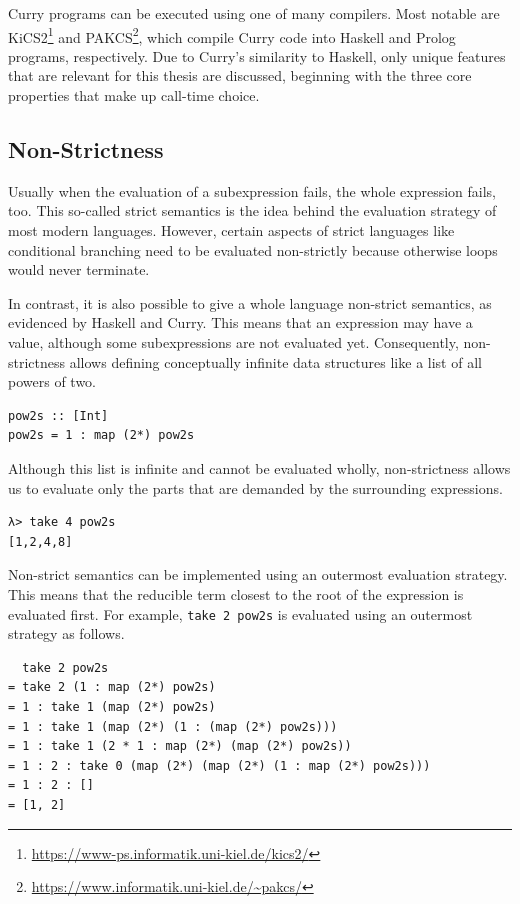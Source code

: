 \documentclass[a4paper, 11pt, fleqn, twoside]{scrreprt}
\newcommand{\hinl}[1]{\texttt{#1}}
\begin{document}
Curry programs can be executed using one of many compilers.
Most notable are KiCS2\footnote{\url{https://www-ps.informatik.uni-kiel.de/kics2/}} and PAKCS\footnote{\url{https://www.informatik.uni-kiel.de/~pakcs/}}, which compile Curry code into Haskell and Prolog programs, respectively.
Due to Curry's similarity to Haskell, only unique features that are relevant for this thesis are discussed, beginning with the three core properties that make up call-time choice.

\subsection{Non-Strictness}
Usually when the evaluation of a subexpression fails, the whole expression fails, too.
This so-called strict semantics is the idea behind the evaluation strategy of most modern languages.
However, certain aspects of strict languages like conditional branching need to be evaluated non-strictly because otherwise loops would never terminate.

In contrast, it is also possible to give a whole language non-strict semantics, as evidenced by Haskell and Curry.
This means that an expression may have a value, although some subexpressions are not evaluated yet.
Consequently, non-strictness allows defining conceptually infinite data structures like a list of all powers of two.

\begin{verbatim}
pow2s :: [Int]
pow2s = 1 : map (2*) pow2s
\end{verbatim}

Although this list is infinite and cannot be evaluated wholly, non-strictness allows us to evaluate only the parts that are demanded by the surrounding expressions.

\begin{verbatim}
λ> take 4 pow2s
[1,2,4,8]
\end{verbatim}

Non-strict semantics can be implemented using an outermost evaluation strategy.
This means that the reducible term closest to the root of the expression is evaluated first.
For example, \hinl{take 2 pow2s} is evaluated using an outermost strategy as follows.

\begin{verbatim}
  take 2 pow2s
= take 2 (1 : map (2*) pow2s)
= 1 : take 1 (map (2*) pow2s)
= 1 : take 1 (map (2*) (1 : (map (2*) pow2s)))
= 1 : take 1 (2 * 1 : map (2*) (map (2*) pow2s))
= 1 : 2 : take 0 (map (2*) (map (2*) (1 : map (2*) pow2s)))
= 1 : 2 : []
= [1, 2]
\end{verbatim}
\end{document}
